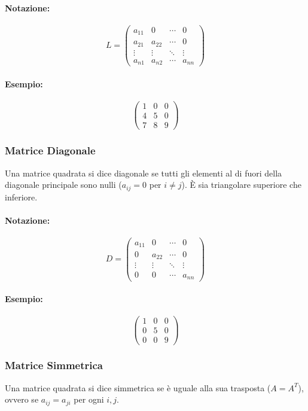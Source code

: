 \documentclass{article}
\begin{document}
\paragraph{Notazione:}
\[ L = \begin{pmatrix}
a_{11} & 0 & \cdots & 0 \\
a_{21} & a_{22} & \cdots & 0 \\
\vdots & \vdots & \ddots & \vdots \\
a_{n1} & a_{n2} & \cdots & a_{nn}
\end{pmatrix} \]
\paragraph{Esempio:}
\[ \begin{pmatrix}
1 & 0 & 0 \\
4 & 5 & 0 \\
7 & 8 & 9
\end{pmatrix} \]

\subsubsection*{Matrice Diagonale}
Una matrice quadrata si dice diagonale se tutti gli elementi al di fuori della diagonale principale sono nulli ($a_{ij} = 0$ per $i \neq j$). È sia triangolare superiore che inferiore.
\paragraph{Notazione:}
\[ D = \begin{pmatrix}
a_{11} & 0 & \cdots & 0 \\
0 & a_{22} & \cdots & 0 \\
\vdots & \vdots & \ddots & \vdots \\
0 & 0 & \cdots & a_{nn}
\end{pmatrix} \]
\paragraph{Esempio:}
\[ \begin{pmatrix}
1 & 0 & 0 \\
0 & 5 & 0 \\
0 & 0 & 9
\end{pmatrix} \]

\subsubsection*{Matrice Simmetrica}
Una matrice quadrata si dice simmetrica se è uguale alla sua trasposta ($A = A^T$), ovvero se $a_{ij} = a_{ji}$ per ogni $i,j$.
\end{document}
